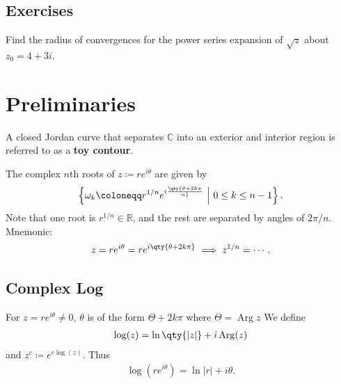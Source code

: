 \hypertarget{exercises}{%
\subsection{Exercises}\label{exercises}}

\begin{exercise}[?]

Find the radius of convergences for the power series expansion of
\(\sqrt{z}\) about \(z_0 = 4 +3i\).

\end{exercise}

\hypertarget{preliminaries}{%
\section{Preliminaries}\label{preliminaries}}

\begin{definition}

A closed Jordan curve that separates \({\mathbb{C}}\) into an exterior
and interior region is referred to as a \textbf{toy contour}.

\end{definition}

\begin{fact}

The complex \(n\)th roots of \(z \coloneqq r e^{i\theta}\) are given by
\begin{align*}
\left\{{ \omega_k \coloneqq r^{1/n} e^{i \qty{ \theta + 2k\pi \over n} } {~\mathrel{\Big|}~}0 \leq k \leq n-1 }\right\}
.\end{align*}
Note that one root is \(r^{1/n}\in {\mathbb{R}}\), and the rest are
separated by angles of \(2\pi/n\). Mnemonic:
\begin{align*}
z = re^{i\theta} = re^{i\qty{\theta + 2k\pi}} \implies z^{1/n} = \cdots
.\end{align*}

\end{fact}

\hypertarget{complex-log}{%
\subsection{Complex Log}\label{complex-log}}

\begin{fact}

For \(z= r e^{i\theta}\neq 0\), \(\theta\) is of the form
\(\Theta + 2k\pi\) where \(\Theta = \operatorname{Arg}z\) We define
\begin{align*}
\log(z) = \ln\qty{{\left\lvert {z} \right\rvert}} + i\operatorname{Arg}(z)
\end{align*}
and \(z^c \coloneqq e^{c\log(z)}\). Thus
\begin{align*}
\log(re^{i\theta}) = \ln {\left\lvert {r} \right\rvert} + i\theta
.\end{align*}

\end{fact}

